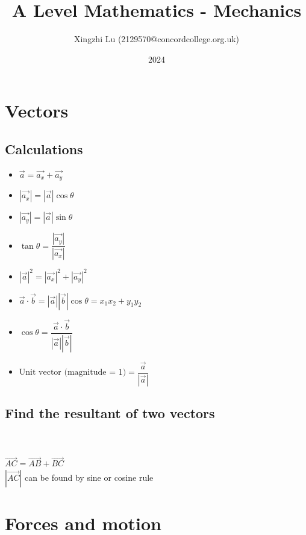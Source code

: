 \documentclass[A4paper]{article}
\title{A Level Mathematics - Mechanics}
\author{Xingzhi Lu (2129570@concordcollege.org.uk)}
\date{2024}
\begin{document}
	\maketitle

	\section{Vectors}
	\subsection{Calculations}
	\begin{itemize}
		\item $\vec{a}=\vec{a_x}+\vec{a_y}$
		\item $|\vec{a_x}|=|\vec{a}|\cos\theta$
		\item $|\vec{a_y}|=|\vec{a}|\sin\theta$
		\item $\tan\theta = \dfrac{|\vec{a_y}|}{|\vec{a_x}|}$
		\item $|\vec{a}|^2=|\vec{a_x}|^2+|\vec{a_y}|^2$
		\item $\vec{a} \cdot \vec{b} = |\vec{a}||\vec{b}|\cos\theta = x_1x_2+y_1y_2$
		\item $\cos \theta = \dfrac{\vec{a} \cdot \vec{b}}{|\vec{a}||\vec{b}|}$
		\item $\text{Unit vector (magnitude = 1)} = \dfrac{\vec{a}}{|\vec{a}|}$

	\end{itemize}
	\subsection{Find the resultant of two vectors}
	\\
	\\
	$\overrightarrow{AC}=\overrightarrow{AB}+\overrightarrow{BC}$\\
	$|\overrightarrow{AC}|$ can be found by sine or cosine rule

	\pagebreak

	\section{Forces and motion}
	
\end{document}
